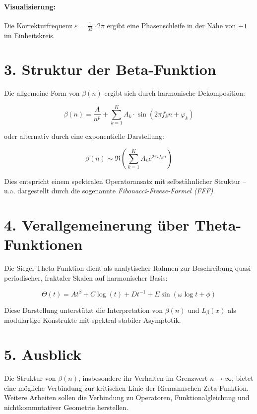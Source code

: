\documentclass[a4paper,12pt]{article}
\begin{document}
\paragraph{Visualisierung:}  
Die Korrekturfrequenz \( \varepsilon = \frac{1}{33} \cdot 2\pi \) ergibt eine Phasenschleife in der Nähe von \( -1 \) im Einheitskreis.

\bigskip

\section*{3. Struktur der Beta-Funktion}

Die allgemeine Form von \( \beta(n) \) ergibt sich durch harmonische Dekomposition:

\[
\beta(n) = \frac{A}{n^p} + \sum_{k=1}^{K} A_k \cdot \sin(2\pi f_k n + \varphi_k)
\]

oder alternativ durch eine exponentielle Darstellung:

\[
\beta(n) \sim \Re\left( \sum_{k=1}^K A_k e^{2\pi i f_k n} \right)
\]

Dies entspricht einem spektralen Operatoransatz mit selbstähnlicher Struktur – u.a. dargestellt durch die sogenannte \textit{Fibonacci-Freese-Formel (FFF)}.

\bigskip

\section*{4. Verallgemeinerung über Theta-Funktionen}

Die Siegel-Theta-Funktion dient als analytischer Rahmen zur Beschreibung quasi-periodischer, fraktaler Skalen auf harmonischer Basis:

\[
\Theta(t) = A t^\beta + C \log(t) + D t^{-1} + E \sin(\omega \log t + \phi)
\]

Diese Darstellung unterstützt die Interpretation von \( \beta(n) \) und \( L_\beta(x) \) als modulartige Konstrukte mit spektral-stabiler Asymptotik.

\bigskip

\section*{5. Ausblick}

Die Struktur von \( \beta(n) \), insbesondere ihr Verhalten im Grenzwert \( n \to \infty \), bietet eine mögliche Verbindung zur kritischen Linie der Riemannschen Zeta-Funktion. Weitere Arbeiten sollen die Verbindung zu Operatoren, Funktionalgleichung und nichtkommutativer Geometrie herstellen.
\end{document}

